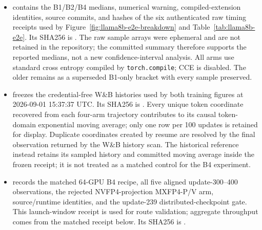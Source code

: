 \begin{itemize}
  ;
  the authenticated raw receipt SHA256 is
  .
  The benchmark source is
  .
  \item
  contains the B1/B2/B4 medians, numerical warning, compiled-extension
  identities, source commits, and hashes of the six authenticated raw timing
  receipts used by Figure~\ref{fig:llama8b-e2e-breakdown} and
  Table~\ref{tab:llama8b-e2e}.  Its SHA256 is
  .
  The raw sample arrays were ephemeral and are not retained in the repository;
  the committed summary therefore supports the reported medians, not a new
  confidence-interval analysis.  All arms use standard cross entropy compiled
  by \texttt{torch.compile}; CCE is disabled.  The older
   remains as a superseded
  B1-only bracket with every sample preserved.
  \item {} freezes the
  credential-free W\&B histories used by both training figures at
  2026-09-01 15:37:37 UTC.  Its SHA256 is
  .
  Every unique token coordinate recovered from each four-arm trajectory contributes
  to its causal token-domain exponential moving average; only one row per 100
  updates is retained for display.  Duplicate coordinates created by resume
  are resolved by the final observation returned by the W\&B history scan.
  The historical reference instead retains its sampled history and committed moving average
  inside the frozen receipt; it is not treated as a matched control for the
  B4 experiment.
  \item {} records the
  matched 64-GPU B4 recipe, all five aligned update-300--400 observations,
  the rejected NVFP4-projection MXFP4-P/V arm, source/runtime identities, and
  the update-239 distributed-checkpoint gate.  This launch-window receipt is
  used for route validation; aggregate throughput comes from the matched
  receipt below.  Its SHA256 is
  .

\end{itemize}
